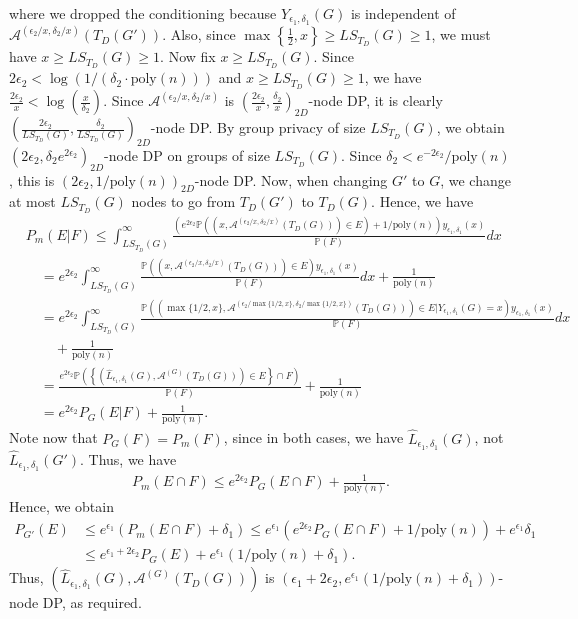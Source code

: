 \documentclass{article}
\begin{document}
where we dropped the conditioning because $Y_{\epsilon_1, \delta_1}(G)$ is independent of $\mathcal{A}^{(\epsilon_2/x, \delta_2/x)}(T_D(G'))$. Also, since $\max\left\{\frac{1}{2}, x\right\} \geq LS_{T_D}(G) \geq 1$, we must have $x \geq LS_{T_D}(G) \geq 1$. Now fix $x \geq LS_{{T_D}}(G)$. Since $2\epsilon_2 < \log(1/(\delta_2 \cdot \mathrm{poly}(n)))$ and $x \geq LS_{T_D}(G) \geq 1$, we have $\frac{2\epsilon_2}{x} < \log\left(\frac{x}{\delta_2}\right)$. Since $\mathcal{A}^{(\epsilon_2/x, \delta_2/x)}$ is $\left(\frac{2\epsilon_2}{x}, \frac{\delta_2}{x}\right)_{2D}$-node DP, it is clearly $\left(\frac{2\epsilon_2}{LS_{T_D}(G)}, \frac{\delta_2}{LS_{T_D}(G)}\right)_{2D}$-node DP. By group privacy of size $LS_{T_D}(G)$, we obtain $\left(2\epsilon_2, \delta_2e^{2\epsilon_2}\right)_{2D}$-node DP on groups of size $LS_{T_D}(G)$. Since $\delta_2 < e^{-2\epsilon_2}/\mathrm{poly}(n)$, this is $(2\epsilon_2, 1/\mathrm{poly}(n))_{2D}$-node DP. Now, when changing $G'$ to $G$, we change at most $LS_{T_D}(G)$ nodes to go from $T_D(G')$ to $T_D(G)$. Hence, we have
\begin{align*}
& P_{m}(E|F) \leq \int_{LS_{{T_D}}(G)}^{\infty}\frac{\left(e^{2\epsilon_2}\mathbb{P}\left((x, \mathcal{A}^{(\epsilon_2/x, \delta_2/x)}(T_D(G))) \in E\right) + 1/\mathrm{poly}(n)\right)y_{\epsilon_1, \delta_1}(x)}{\mathbb{P}(F)}dx\\
& \quad = e^{2\epsilon_2}\int_{LS_{{T_D}}(G)}^{\infty}\frac{\mathbb{P}\left((x, \mathcal{A}^{(\epsilon_2/x, \delta_2/x)}(T_D(G))) \in E\right)y_{\epsilon_1, \delta_1}(x)}{\mathbb{P}(F)}dx + \frac{1}{\mathrm{poly}(n)}\\
& \quad = e^{2\epsilon_2}\int_{LS_{{T_D}}(G)}^{\infty}\frac{\mathbb{P}\left((\max\{1/2, x\}, \mathcal{A}^{(\epsilon_2/\max\{1/2, x\}, \delta_2/\max\{1/2, x\})}(T_D(G))) \in E|Y_{\epsilon_1, \delta_1}(G) = x\right)y_{\epsilon_1, \delta_1}(x)}{\mathbb{P}(F)}dx\\
& \qquad + \frac{1}{\mathrm{poly}(n)}\\
&\quad = \frac{e^{2\epsilon_2}\mathbb{P}\left(\left\{(\hat{L}_{\epsilon_1, \delta_1}(G), \mathcal{A}^{(G)}(T_D(G)))\in E\right\} \cap F\right)}{\mathbb{P}(F)} + \frac{1}{\mathrm{poly}(n)} \\
%
& \quad = e^{2\epsilon_2}P_{G}(E|F) + \frac{1}{\mathrm{poly}(n)}.
\end{align*}
Note now that $P_{G}(F) = P_{m}(F)$, since in both cases, we have $\hat{L}_{\epsilon_1, \delta_1}(G)$, not $\hat{L}_{\epsilon_1, \delta_1}(G')$. Thus, we have
\begin{align*}
P_{m}(E \cap F) \leq e^{2\epsilon_2}P_{G}(E \cap F) + \frac{1}{\mathrm{poly}(n)}.
\end{align*}
Hence, we obtain
\begin{align*}
P_{G'}(E) &\leq e^{\epsilon_1}(P_m(E \cap F) + \delta_1) \leq e^{\epsilon_1}(e^{2\epsilon_2}P_G(E \cap F) + 1/\mathrm{poly}(n)) + e^{\epsilon_1}\delta_1\\
&\leq e^{\epsilon_1 + 2\epsilon_2}P_G(E) + e^{\epsilon_1}(1/\mathrm{poly}(n) + \delta_1).
\end{align*}
Thus, $(\hat{L}_{\epsilon_1, \delta_1}(G), \mathcal{A}^{(G)}(T_D(G)))$ is $(\epsilon_1 + 2\epsilon_2, e^{\epsilon_1}(1/\mathrm{poly}(n) + \delta_1))$-node DP, as required.
\end{document}
